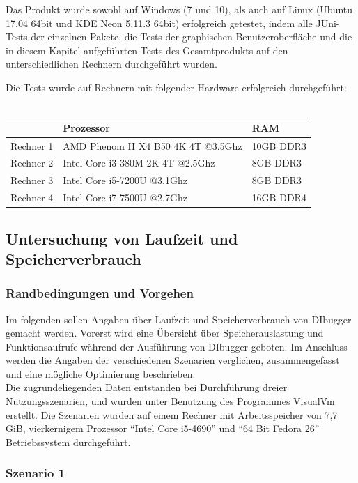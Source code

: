 \documentclass[parskip=full]{scrartcl}
\begin{document}
Das Produkt wurde sowohl auf Windows (7 und 10), als auch auf Linux (Ubuntu 17.04 64bit und KDE Neon 5.11.3 64bit) erfolgreich getestet, indem alle JUni-Tests der einzelnen Pakete, die Tests der graphischen Benutzeroberfläche und die in diesem Kapitel aufgeführten Tests des Gesamtprodukts auf den unterschiedlichen Rechnern durchgeführt wurden.

Die Tests wurde auf Rechnern mit folgender Hardware erfolgreich durchgeführt: \\ \\
\begin{tabular}{l||l|l}
   	 & Prozessor & RAM \\
	\hline
	\hline
	Rechner 1 & AMD Phenom II X4 B50 4K 4T @3.5Ghz & 10GB DDR3 \\
	Rechner 2 & Intel Core i3-380M 2K 4T @2.5Ghz & 8GB DDR3 \\
	Rechner 3 & Intel Core i5-7200U @3.1Ghz & 8GB DDR3 \\
	Rechner 4 & Intel Core i7-7500U @2.7Ghz & 16GB DDR4\\
\end{tabular}


\subsection{Untersuchung von Laufzeit und Speicherverbrauch}
    \subsubsection{Randbedingungen und Vorgehen}
        Im folgenden sollen Angaben über Laufzeit und Speicherverbrauch von DIbugger gemacht werden.
        Vorerst wird eine Übersicht über Speicherauslastung und Funktionsaufrufe während der Ausführung von DIbugger geboten.
        Im Anschluss werden die Angaben der verschiedenen Szenarien verglichen, zusammengefasst und eine mögliche Optimierung beschrieben.\\
        Die zugrundeliegenden Daten entstanden bei Durchführung dreier Nutzungsszenarien, und wurden unter Benutzung des Programmes VisualVm erstellt.
        Die Szenarien wurden auf einem Rechner mit Arbeitsspeicher von 7,7 GiB, vierkernigem Prozessor \enquote{Intel Core i5-4690} und \enquote{64 Bit Fedora 26} Betriebssystem durchgeführt.

    \subsubsection{Szenario 1}
\end{document}

